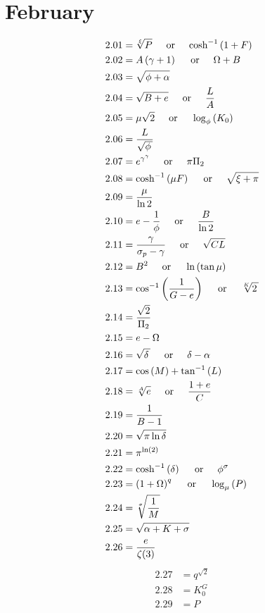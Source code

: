 \documentclass[12pt]{article}
\newcommand{\acos}{\text{cos}^{-1}}
\newcommand{\atan}{\text{tan}^{-1}}
\newcommand{\acosh}{\text{cosh}^{-1}}
\newcommand{\oder}{\hspace{5mm}\text{or}\hspace{5mm}}
\begin{document}
\pagebreak

\section{February}
\begin{align*}
2.01 &= \sqrt[\xi]{P} \oder \acosh\left(1+F\right)\\
2.02 &= A \left(\gamma+1\right) \oder \Omega+B\\
2.03 &= \sqrt{\phi+\alpha}\\
2.04 &= \sqrt{B+e} \oder \frac{L}{A}\\
2.05 &= \mu \sqrt{2} \oder \log_{\phi}\left(K_{0}\right)\\
2.06 &= \frac{L}{\sqrt{\phi\,}}\\
2.07 &= e^{\gamma^{\gamma}} \oder \pi \Pi_{2}\\
2.08 &= \acosh\left(\mu F\right) \oder \sqrt{\xi+\pi} \\
2.09 &= \frac{\mu}{\ln{2}}\\
2.10 &= e-\frac{1}{\phi} \oder \frac{B}{\ln{2}}\\
2.11 &= \frac{\gamma}{\sigma_{p}-\gamma} \oder \sqrt{C L}\\
2.12 &= B^{2} \oder \ln\left(\tan{\mu}\right)\\
2.13 &= \acos\left(\frac{1}{G-e}\right) \oder \sqrt[K]{2\,}\\
2.14 &= \frac{\sqrt{2}}{\Pi_{2}}\\
2.15 &= e-\Omega\\
2.16 &= \sqrt{\delta\,} \oder \delta-\alpha\\
2.17 &= \cos\left(M\right)+\atan\left(L\right)\\
2.18 &= \sqrt[A]{e} \oder \frac{1 + e}{C}\\
2.19 &= \frac{1}{B-1}\\
2.20 &= \sqrt{\pi \ln{\delta}}\\
2.21 &= \pi^{\ln(2)}\\
2.22 &= \cosh^{-1}\left(\delta\right) \oder \phi^{\sigma}\\
2.23 &= \left(1+\Omega\right)^{q} \oder \log_{\mu}\left(P\right)\\
2.24 &= \sqrt[\sigma]{\frac{1}{M}}\\
2.25 &= \sqrt{\alpha+K+\sigma}\\
2.26 &= \frac{e}{\zeta(3)}\\
\end{align*}
\begin{align*}
2.27 &= q^{\sqrt{2}}\\
2.28 &= K_{0}^{G}\\
2.29 &= P\\
\end{align*}
\end{document}
